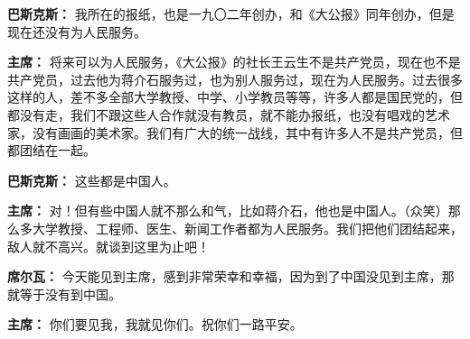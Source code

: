 \begin{duihua}
\item[\textbf{巴斯克斯：}] 我所在的报纸，也是一九〇二年创办，和《大公报》同年创办，但是现在还没有为人民服务。

\item[\textbf{主席：}] 将来可以为人民服务，《大公报》的社长王云生不是共产党员，现在也不是共产党员，过去他为蒋介石服务过，也为别人服务过，现在为人民服务。过去很多这样的人，差不多全部大学教授、中学、小学教员等等，许多人都是国民党的，但都没有走，我们不跟这些人合作就没有教员，就不能办报纸，也没有唱戏的艺术家，没有画画的美术家。我们有广大的统一战线，其中有许多人不是共产党员，但都团结在一起。

\item[\textbf{巴斯克斯：}] 这些都是中国人。

\item[\textbf{主席：}] 对！但有些中国人就不那么和气，比如蒋介石，他也是中国人。（众笑）那么多大学教授、工程师、医生、新闻工作者都为人民服务。我们把他们团结起来，敌人就不高兴。就谈到这里为止吧！

\item[\textbf{席尔瓦：}] 今天能见到主席，感到非常荣幸和幸福，因为到了中国没见到主席，那就等于没有到中国。

\item[\textbf{主席：}] 你们要见我，我就见你们。祝你们一路平安。

\end{duihua}

